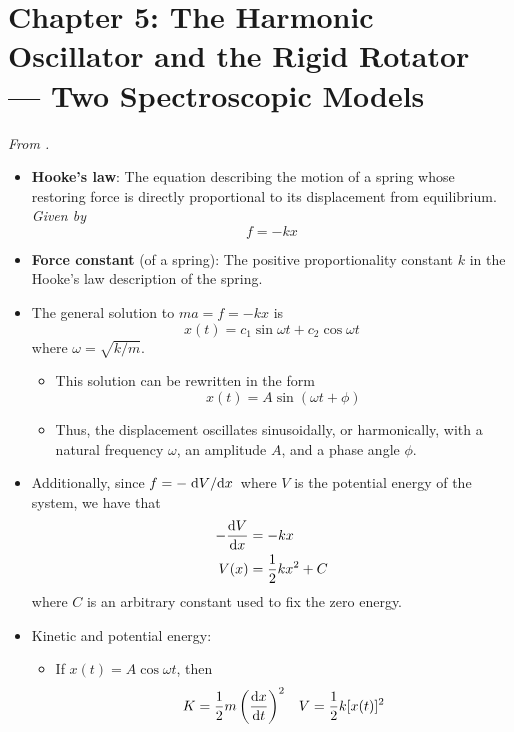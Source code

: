 \documentclass[../notes.tex]{subfiles}
\begin{document}
\section{Chapter 5: The Harmonic Oscillator and the Rigid Rotator --- Two Spectroscopic Models}
\emph{From \textcite{bib:McQuarrieSimon}.}
\begin{itemize}
    \item \textbf{Hooke's law}: The equation describing the motion of a spring whose restoring force is directly proportional to its displacement from equilibrium. \emph{Given by}
    \begin{equation*}
        f = -kx
    \end{equation*}
    \item \textbf{Force constant} (of a spring): The positive proportionality constant $k$ in the Hooke's law description of the spring.
    \item The general solution to $ma=f=-kx$ is
    \begin{equation*}
        x(t) = c_1\sin\omega t+c_2\cos\omega t
    \end{equation*}
    where $\omega=\sqrt{k/m}$.
    \begin{itemize}
        \item This solution can be rewritten in the form
        \begin{equation*}
            x(t) = A\sin(\omega t+\phi)
        \end{equation*}
        \item Thus, the displacement oscillates sinusoidally, or harmonically, with a natural frequency $\omega$, an amplitude $A$, and a phase angle $\phi$.
    \end{itemize}
    \item Additionally, since $f=-\dv*{V}{x}$ where $V$ is the potential energy of the system, we have that
    \begin{align*}
        -\dv{V}{x} &= -kx\\
        V(x) &= \frac{1}{2}kx^2+C
    \end{align*}
    where $C$ is an arbitrary constant used to fix the zero energy.
    \item Kinetic and potential energy:
    \begin{itemize}
        \item If $x(t)=A\cos\omega t$, then
        \begin{align*}
            K &= \frac{1}{2}m\left( \dv{x}{t} \right)^2&
                V &= \frac{1}{2}k[x(t)]^2\\

\end{align*}
\end{itemize}
\end{itemize}
\end{document}
